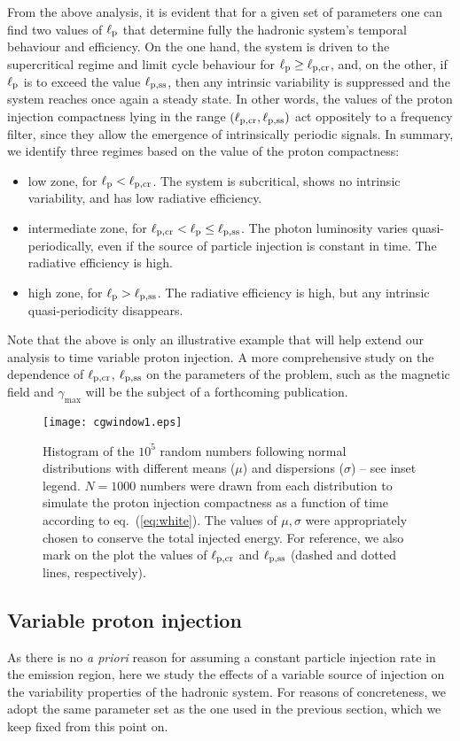\documentclass[fleqn,usenatbib]{mnras}
\newcommand{\lp}{\ell_{\rm p}}
\newcommand{\lpcrss}{\ell_{\rm p, ss}}
\newcommand{\lpcr}{\ell_{\rm p,cr}}
\newcommand{\gmx}{\gamma_{\max}}
\begin{document}
{From the above analysis, it is evident that
for a given set of parameters one can find two values of $\lp$ 
that determine fully the hadronic system's temporal behaviour and efficiency.
On the one hand, the system is driven to the supercritical regime
and limit cycle behaviour for $\lp \ge \lpcr$, and, on the other, if $\lp$ is to exceed the value $\lpcrss$, then any intrinsic variability is suppressed and the system reaches once again a steady state. In other words, the values  of the proton injection compactness lying
in the range $(\lpcr, \lpcrss)$ act oppositely to a frequency filter, since they allow the emergence of  intrinsically periodic signals.
In summary, we identify three regimes based on the value of the proton compactness:
\begin{itemize}
\item low zone, for $\lp < \lpcr$. The system is subcritical, shows no intrinsic variability, and has low radiative efficiency.
\item intermediate zone, for $\lpcr < \lp \le \lpcrss$. The photon luminosity varies quasi-periodically, even if the source of particle injection is constant in time. The radiative efficiency is high. 
\item high zone, for  $\lp > \lpcrss$. The radiative efficiency is high, but any intrinsic quasi-periodicity disappears.
\end{itemize}
Note that the above is only an illustrative example that will help extend our analysis to time variable
proton injection. A more comprehensive study on the dependence of $\lpcr$, $\lpcrss$ 
on the parameters of the problem, such as the magnetic field and $\gmx$ will be the subject of a forthcoming publication.
\begin{figure}
\centering
 \texttt{[image: cgwindow1.eps]}
 \caption{Histogram of the $10^5$ random numbers following normal distributions with different means ($\mu$) and dispersions ($\sigma$) -- see inset legend. $N=1000$ numbers were drawn from each distribution to simulate the proton injection  compactness as a function of time according to eq.~(\ref{eq:white}). The values of $\mu, \sigma$ were appropriately chosen to conserve the total injected
 energy. For reference, we also mark on the plot the values of $\lpcr$ and $\lpcrss$ (dashed and dotted lines, respectively). 
 }
 \label{histo}
\end{figure}
\subsection{Variable proton injection}\label{sec:var}
As there is no {\sl a priori} reason for assuming 
a constant particle injection rate in the emission region, here 
we study the effects of a variable source of injection
on the variability properties of the hadronic system.
For reasons of concreteness,  we adopt the same parameter set as the one used in the previous section, which we keep fixed from this point on.

}
\end{document}
